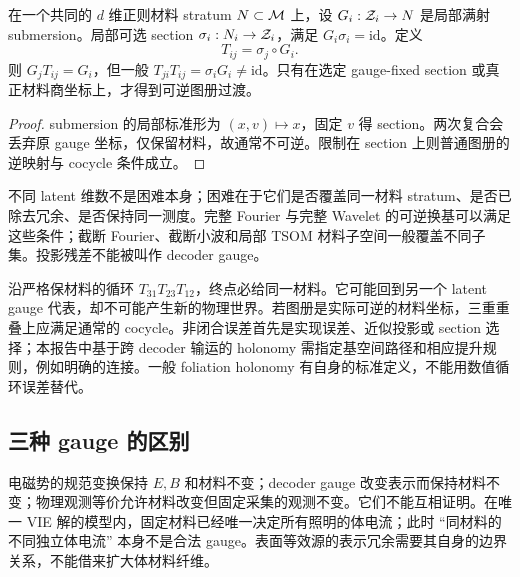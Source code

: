 \begin{proposition}
在一个共同的 $d$ 维正则材料 stratum $N\subset\mathcal M$ 上，设 $G_i:\mathcal Z_i\to N$ 是局部满射 submersion。局部可选 section $\sigma_i:N_i\to\mathcal Z_i$，满足 $G_i\sigma_i=\mathrm{id}$。定义
\begin{equation}
T_{ij}=\sigma_j\circ G_i.
\end{equation}
则 $G_jT_{ij}=G_i$，但一般 $T_{ji}T_{ij}=\sigma_iG_i\ne\mathrm{id}$。只有在选定 gauge-fixed section 或真正材料商坐标上，才得到可逆图册过渡。
\end{proposition}
\begin{proof}
submersion 的局部标准形为 $(x,v)\mapsto x$，固定 $v$ 得 section。两次复合会丢弃原 gauge 坐标，仅保留材料，故通常不可逆。限制在 section 上则普通图册的逆映射与 cocycle 条件成立。
\end{proof}

不同 latent 维数不是困难本身；困难在于它们是否覆盖同一材料 stratum、是否已除去冗余、是否保持同一测度。完整 Fourier 与完整 Wavelet 的可逆换基可以满足这些条件；截断 Fourier、截断小波和局部 TSOM 材料子空间一般覆盖不同子集。投影残差不能被叫作 decoder gauge。

沿严格保材料的循环 $T_{31}T_{23}T_{12}$，终点必给同一材料。它可能回到另一个 latent gauge 代表，却不可能产生新的物理世界。若图册是实际可逆的材料坐标，三重重叠上应满足通常的 cocycle。非闭合误差首先是实现误差、近似投影或 section 选择；本报告中基于跨 decoder 输运的 holonomy 需指定基空间路径和相应提升规则，例如明确的连接。一般 foliation holonomy 有自身的标准定义，不能用数值循环误差替代。

\subsection{三种 gauge 的区别}

电磁势的规范变换保持 $E,B$ 和材料不变；decoder gauge 改变表示而保持材料不变；物理观测等价允许材料改变但固定采集的观测不变。它们不能互相证明。在唯一 VIE 解的模型内，固定材料已经唯一决定所有照明的体电流；此时 ``同材料的不同独立体电流'' 本身不是合法 gauge。表面等效源的表示冗余需要其自身的边界关系，不能借来扩大体材料纤维。
